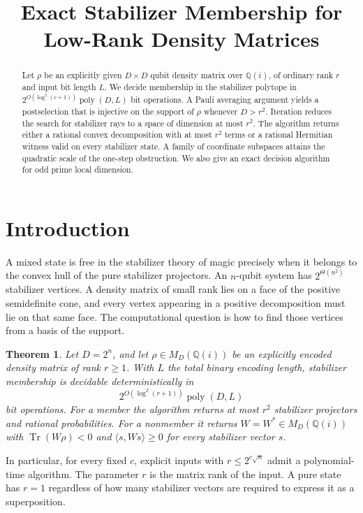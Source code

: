 \documentclass[11pt,letterpaper]{article}
\title{Exact Stabilizer Membership for Low-Rank Density Matrices}
\author{}
\date{}
\makeatletter
\newtheorem{theorem}{Theorem}[section]
\theoremstyle{definition}
\numberwithin{equation}{section}
\DeclareMathOperator{\Tr}{Tr}
\newcommand{\Q}{\mathbb Q}
\renewcommand{\maketitle}{\begin{center}{\LARGE\@title\par}\end{center}\vspace{.25em}}
\makeatother
\begin{document}
\maketitle
\begin{abstract}
Let \(\rho\) be an explicitly given \(D\times D\) qubit density matrix over \(\Q(i)\), of ordinary rank \(r\) and input bit length \(L\). We decide membership in the stabilizer polytope in \(2^{O(\log^2(r+1))}\operatorname{poly}(D,L)\) bit operations. A Pauli averaging argument yields a postselection that is injective on the support of \(\rho\) whenever \(D>r^2\). Iteration reduces the search for stabilizer rays to a space of dimension at most \(r^2\). The algorithm returns either a rational convex decomposition with at most \(r^2\) terms or a rational Hermitian witness valid on every stabilizer state. A family of coordinate subspaces attains the quadratic scale of the one-step obstruction. We also give an exact decision algorithm for odd prime local dimension.
\end{abstract}
\section{Introduction}
A mixed state is free in the stabilizer theory of magic precisely when it belongs to the convex hull of the pure stabilizer projectors. An \(n\)-qubit system has \(2^{\Theta(n^2)}\) stabilizer vertices. A density matrix of small rank lies on a face of the positive semidefinite cone, and every vertex appearing in a positive decomposition must lie on that same face. The computational question is how to find those vertices from a basis of the support.

\begin{theorem}\label{thm:qubit}
Let \(D=2^n\), and let \(\rho\in M_D(\Q(i))\) be an explicitly encoded density matrix of rank \(r\ge1\). With \(L\) the total binary encoding length, stabilizer membership is decidable deterministically in
\[
2^{O(\log^2(r+1))}\operatorname{poly}(D,L)
\]
bit operations. For a member the algorithm returns at most \(r^2\) stabilizer projectors and rational probabilities. For a nonmember it returns \(W=W^*\in M_D(\Q(i))\) with \(\Tr(W\rho)<0\) and \(\langle s,Ws\rangle\ge0\) for every stabilizer vector \(s\).
\end{theorem}
In particular, for every fixed \(c\), explicit inputs with \(r\le2^{c\sqrt n}\) admit a polynomial-time algorithm. The parameter \(r\) is the matrix rank of the input. A pure state has \(r=1\) regardless of how many stabilizer vectors are required to express it as a superposition.
\end{document}
